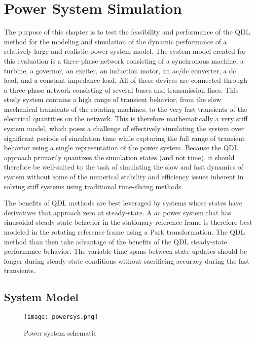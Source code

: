 
\chapter{Power System Simulation}\label{chap:powersys}

The purpose of this chapter is to test the feasibility and performance of the QDL method for the modeling and simulation of the dynamic performance of a relatively large and realistic power system model. The system model created for this evaluation is a three-phase network consisting of a synchronous machine, a turbine, a governor, an exciter, an induction motor, an ac/dc converter, a dc load, and a constant impedance load. All of these devices are connected through a three-phase network consisting of several buses and transmission lines. This study system contains a high range of transient behavior, from the slow mechanical transients of the rotating machines, to the very fast transients of the electrical quantities on the network. This is therefore mathematically a very stiff system model, which poses a challenge of effectively simulating the system over significant periods of simulation time while capturing the full range of transient behavior using a single representation of the power system. Because the QDL approach primarily quantizes the simulation states (and not time), it should therefore be well-suited to the task of simulating the slow and fast dynamics of system without some of the numerical stability and efficiency issues inherent in solving stiff systems using traditional time-slicing methods. 

The benefits of QDL methods are best leveraged by systems whose states have derivatives that approach zero at steady-state. A ac power system that has sinusoidal steady-state behavior in the stationary reference frame is therefore best modeled in the rotating reference frame using a Park transformation. The QDL method than then take advantage of the benefits of the QDL steady-state performance behavior. The variable time spans between state updates should be longer during steady-state conditions without sacrificing accuracy during the fast transients.

\section{System Model}

\begin{figure}[h]
    \label{fig:powersys}
    \centering
    \texttt{[image: powersys.png]}
    \caption{Power system schematic}
\end{figure}


